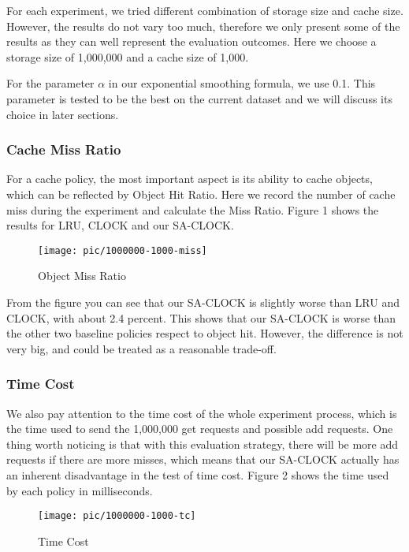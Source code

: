 \documentclass[journal,10.5pt,onecolumn]{IEEEtran}
\begin{document}
For each experiment, we tried different combination of storage size and cache size. However, the results do not vary too much, therefore we only present some of the results as they can well represent the evaluation outcomes. Here we choose a storage size of 1,000,000 and a cache size of 1,000.

For the parameter $\alpha$ in our exponential smoothing formula, we use 0.1. This parameter is tested to be the best on the current dataset and we will discuss its choice in later sections.

\subsubsection{Cache Miss Ratio}
For a cache policy, the most important aspect is its ability to cache objects, which can be reflected by Object Hit Ratio. Here we record the number of cache miss during the experiment and calculate the Miss Ratio. Figure 1 shows the results for LRU, CLOCK and our SA-CLOCK. 

\begin{figure}[h]
    \centering
    \texttt{[image: pic/1000000-1000-miss]}
    \caption{Object Miss Ratio}
\end{figure}

From the figure you can see that our SA-CLOCK is slightly worse than LRU and CLOCK, with about 2.4 percent. This shows that our SA-CLOCK is worse than the other two baseline policies respect to object hit. However, the difference is not very big, and could be treated as a reasonable trade-off. 

\subsubsection{Time Cost}
We also pay attention to the time cost of the whole experiment process, which is the time used to send the 1,000,000 get requests and possible add requests. One thing worth noticing is that with this evaluation strategy, there will be more add requests if there are more misses, which means that our SA-CLOCK actually has an inherent disadvantage in the test of time cost. Figure 2 shows the time used by each policy in milliseconds.

\begin{figure}[h]
    \centering
    \texttt{[image: pic/1000000-1000-tc]}
    \caption{Time Cost}
\end{figure}
\end{document}
